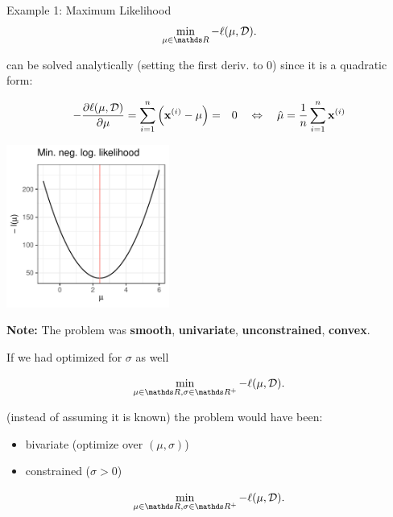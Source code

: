 \documentclass[11pt,compress,t,notes=noshow, xcolor=table]{beamer}
\begin{document}
\begin{vbframe}{Example 1: Maximum Likelihood}
$$
	\min_{\mu \in \R} - \ell(\mu, \D).
$$

can be solved analytically (setting the first deriv. to $0$) since it is a quadratic form:
\vspace*{-0.5cm}

\begin{footnotesize}
\begin{eqnarray*}
	-\frac{\partial \ell(\mu, \mathcal{D})}{\partial \mu} = \sum\limits_{i=1}^n \left(\mathbf{x}^{(i)} - \mu\right) &=& 0 \quad \Leftrightarrow \quad \hat \mu = \frac{1}{n} \sum\limits_{i=1}^n \mathbf{x}^{(i)} 
\end{eqnarray*}
\end{footnotesize}

\vspace*{-0.4cm}

\begin{center}
	\begin{footnotesize}
	\includegraphics[width=0.4\textwidth, keepaspectratio]{figure_man/ml_normal_example_negloglike.pdf} 
	\end{footnotesize}
\end{center}

\framebreak 

\textbf{Note: } The problem was \textbf{smooth}, \textbf{univariate}, \textbf{unconstrained}, \textbf{convex}. 

\lz 

If we had optimized for $\sigma$ as well 

$$
	\min_{\mu \in \R, \sigma \in \R^+} - \ell(\mu, \D).
$$


(instead of assuming it is known) the problem would have been: 

\begin{itemize}
	\item bivariate (optimize over $(\mu, \sigma)$)
	\item constrained ($\sigma > 0$)
\end{itemize}

$$
	\min_{\mu \in \R, \sigma \in \R^+} - \ell(\mu, \D).
$$

\end{vbframe}
\end{document}
